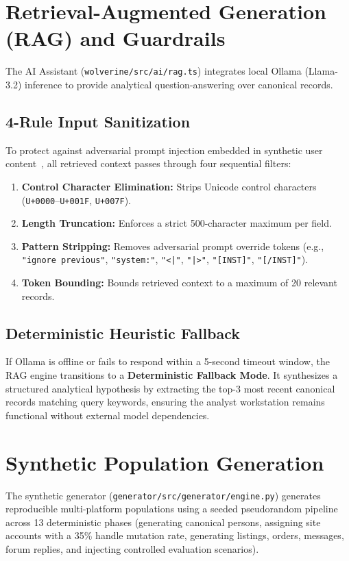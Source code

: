 \section{Retrieval-Augmented Generation (RAG) and Guardrails}
\label{sec:algo-rag}
The AI Assistant (\texttt{wolverine/src/ai/rag.ts}) integrates local Ollama (Llama-3.2) inference to provide analytical question-answering over canonical records.

\subsection{4-Rule Input Sanitization}
To protect against adversarial prompt injection embedded in synthetic user content~\cite{perez2022ignore}, all retrieved context passes through four sequential filters:
\begin{enumerate}
    \item \textbf{Control Character Elimination:} Strips Unicode control characters (\texttt{U+0000}--\texttt{U+001F}, \texttt{U+007F}).
    \item \textbf{Length Truncation:} Enforces a strict 500-character maximum per field.
    \item \textbf{Pattern Stripping:} Removes adversarial prompt override tokens (e.g., \texttt{"ignore previous"}, \texttt{"system:"}, \texttt{"<|"}, \texttt{"|>"}, \texttt{"[INST]"}, \texttt{"[/INST]"}).
    \item \textbf{Token Bounding:} Bounds retrieved context to a maximum of 20 relevant records.
\end{enumerate}

\subsection{Deterministic Heuristic Fallback}
If Ollama is offline or fails to respond within a 5-second timeout window, the RAG engine transitions to a \textbf{Deterministic Fallback Mode}. It synthesizes a structured analytical hypothesis by extracting the top-3 most recent canonical records matching query keywords, ensuring the analyst workstation remains functional without external model dependencies.

\section{Synthetic Population Generation}
\label{sec:algo-synthetic}
The synthetic generator (\texttt{generator/src/generator/engine.py}) generates reproducible multi-platform populations using a seeded pseudorandom pipeline across 13 deterministic phases (generating canonical persons, assigning site accounts with a 35\% handle mutation rate, generating listings, orders, messages, forum replies, and injecting controlled evaluation scenarios).
